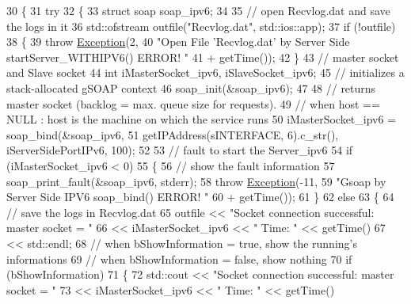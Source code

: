 \begin{DoxyCode}
30 \{
31     \textcolor{keywordflow}{try}
32     \{
33         \textcolor{keyword}{struct }soap soap\_ipv6;
34 
35         \textcolor{comment}{// open Recvlog.dat and save the logs in it}
36         std::ofstream outfile(\textcolor{stringliteral}{"Recvlog.dat"}, std::ios::app);
37         \textcolor{keywordflow}{if} (!outfile)
38         \{
39             \textcolor{keywordflow}{throw} \hyperlink{classException}{Exception}(2,
40                     \textcolor{stringliteral}{"Open File 'Recvlog.dat' by Server Side startServer\_WITHIPV6() ERROR! "}
41                             + getTime());
42         \}
43         \textcolor{comment}{// master socket and Slave socket}
44         \textcolor{keywordtype}{int} iMasterSocket\_ipv6, iSlaveSocket\_ipv6;
45         \textcolor{comment}{// initializes a stack-allocated gSOAP context}
46         soap\_init(&soap\_ipv6);
47 
48         \textcolor{comment}{// returns master socket (backlog = max. queue size for requests).}
49         \textcolor{comment}{// when host == NULL : host is the machine on which the service runs}
50         iMasterSocket\_ipv6 = soap\_bind(&soap\_ipv6,
51                 getIPAddress(sINTERFACE, 6).c\_str(), iServerSidePortIPv6, 100);
52 
53         \textcolor{comment}{// fault to start the Server\_ipv6}
54         \textcolor{keywordflow}{if} (iMasterSocket\_ipv6 < 0)
55         \{
56             \textcolor{comment}{// show the fault information}
57             soap\_print\_fault(&soap\_ipv6, stderr);
58             \textcolor{keywordflow}{throw} \hyperlink{classException}{Exception}(-11,
59                     \textcolor{stringliteral}{"Gsoap by Server Side IPV6 soap\_bind() ERROR! "}
60                             + getTime());
61         \}
62         \textcolor{keywordflow}{else}
63         \{
64             \textcolor{comment}{// save the logs in Recvlog.dat}
65             outfile << \textcolor{stringliteral}{"Socket connection successful: master socket = "}
66                     << iMasterSocket\_ipv6 << \textcolor{stringliteral}{" Time: "} << getTime()
67                     << std::endl;
68             \textcolor{comment}{// when bShowInformation = true, show the running's informations}
69             \textcolor{comment}{// when bShowInformation = false, show nothing}
70             \textcolor{keywordflow}{if} (bShowInformation)
71             \{
72                 std::cout << \textcolor{stringliteral}{"Socket connection successful: master socket = "}
73                         << iMasterSocket\_ipv6 << \textcolor{stringliteral}{" Time: "} << getTime()

\end{DoxyCode}
